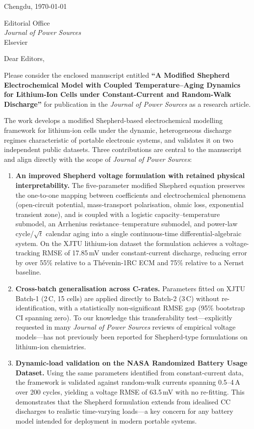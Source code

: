 \documentclass[12pt]{article}
\begin{document}
\begin{flushright}
Chengdu, \today
\end{flushright}

\noindent
Editorial Office\\
\emph{Journal of Power Sources}\\
Elsevier

\bigskip
\noindent Dear Editors,

Please consider the enclosed manuscript entitled \textbf{``A Modified Shepherd Electrochemical Model with Coupled Temperature--Aging Dynamics for Lithium-Ion Cells under Constant-Current and Random-Walk Discharge''} for publication in the \emph{Journal of Power Sources} as a research article.

The work develops a modified Shepherd-based electrochemical modelling framework for lithium-ion cells under the dynamic, heterogeneous discharge regimes characteristic of portable electronic systems, and validates it on two independent public datasets.
Three contributions are central to the manuscript and align directly with the scope of \emph{Journal of Power Sources}:
\begin{enumerate}
    \item \textbf{An improved Shepherd voltage formulation with retained physical interpretability.}
    The five-parameter modified Shepherd equation preserves the one-to-one mapping between coefficients and electrochemical phenomena (open-circuit potential, mass-transport polarisation, ohmic loss, exponential transient zone), and is coupled with a logistic capacity--temperature submodel, an Arrhenius resistance--temperature submodel, and power-law cycle/$\sqrt{t}$ calendar aging into a single continuous-time differential-algebraic system.
    On the XJTU lithium-ion dataset the formulation achieves a voltage-tracking RMSE of 17.85\,mV under constant-current discharge, reducing error by over 55\% relative to a Th\'{e}venin-1RC ECM and 75\% relative to a Nernst baseline.
    \item \textbf{Cross-batch generalisation across C-rates.}
    Parameters fitted on XJTU Batch-1 (2\,C, 15 cells) are applied directly to Batch-2 (3\,C) without re-identification, with a statistically non-significant RMSE gap (95\% bootstrap CI spanning zero).
    To our knowledge this transferability test---explicitly requested in many \emph{Journal of Power Sources} reviews of empirical voltage models---has not previously been reported for Shepherd-type formulations on lithium-ion chemistries.
    \item \textbf{Dynamic-load validation on the NASA Randomized Battery Usage Dataset.}
    Using the same parameters identified from constant-current data, the framework is validated against random-walk currents spanning 0.5--4\,A over 200 cycles, yielding a voltage RMSE of 63.5\,mV with no re-fitting.
    This demonstrates that the Shepherd formulation extends from idealised CC discharges to realistic time-varying loads---a key concern for any battery model intended for deployment in modern portable systems.
\end{enumerate}
\end{document}
